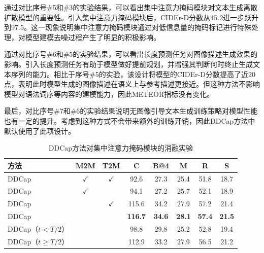 通过对比序号\#5和\#3的实验结果，可以看出集中注意力掩码模块对文本生成离散扩散模型的重要性。引入集中注意力掩码模块后，CIDEr-D分数从45.2进一步跃升到97.5。这一现象说明集中注意力掩码模块通过对低信息量的掩码标记进行特殊处理，对模型建模去噪过程产生了明显的积极影响。%

通过对比序号\#6和\#5的实验结果，可以看出长度预测任务对图像描述生成效果的影响。引入长度预测任务有助于模型做好提前规划，并增强其判断何时终止生成文本序列的能力。相比于序号\#5的实验，该设计将模型的CIDEr-D分数提高了近20点，表明此时模型生成的图像描述在语义上与参考描述更接近。但这种方法不影响模型对语法词序等内容的建模能力，因此METEOR指标没有变化。

最后，对比序号\#7和\#6的实验结果说明无图像引导文本生成训练策略对模型性能也有一定的提升。考虑到这种方式不会带来额外的训练开销，因此DDCap方法中默认使用了此项设计。


\begin{table}
  \centering
  \caption{DDCap方法对集中注意力掩码模块的消融实验}
  \begin{tabular}{lccccccc}
    \toprule
    方法  & M2M & T2M & C & B@4 & M & R & S\\
    \midrule
    DDCap &$\checkmark$&$\checkmark$& 92.6 & 27.3  & 25.4 & 51.8 & 18.7  \\ 
    DDCap &$\checkmark$&& 94.1 & 27.2  & 25.7 & 52.1 & 18.9  \\ 
    DDCap  & &$\checkmark$& 115.6 & 34.2  & 27.9 & 57.2 & 21.4  \\
    DDCap  && & \textbf{116.7} & \textbf{34.6}  & \textbf{28.1} & \textbf{57.4} & \textbf{21.5}\\
     \midrule
    DDCap（$t < T/2$） &&& 98.8 & 29.8  & 25.2 & 52.8 & 19.4\\
    DDCap（$t\geq T/2$）  &&& 112.9 & 33.2  & 27.9 & 56.5 & 21.2\\
    \bottomrule
  \end{tabular}
  \label{tab:ddcap-maskatten}
\end{table}

